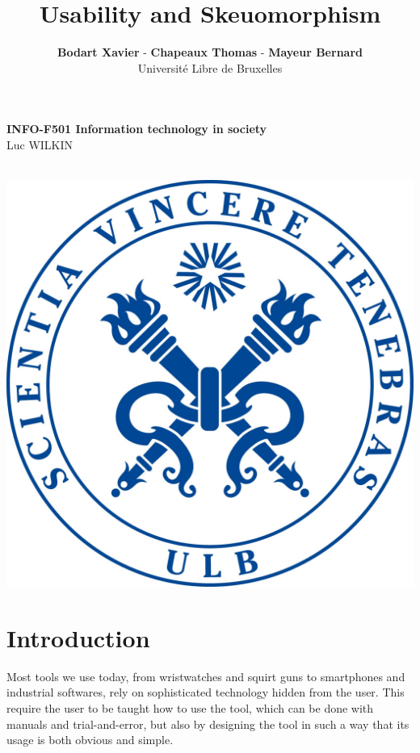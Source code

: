\documentclass[a4paper,11pt] {article}
\theoremstyle{definition}
\begin{document}
\title{\textbf{Usability and Skeuomorphism}}
\author{\textbf{Bodart Xavier} - \textbf{Chapeaux Thomas} - \textbf{Mayeur Bernard} \\
Université Libre de Bruxelles}

\maketitle
\begin{center}

\textbf{INFO-F501 Information technology in society} \\
Luc WILKIN
\end{center}
\begin{center}

~\\

\includegraphics[scale=0.15]{fig-report/ULBjea.jpg}
\end{center}
\pagebreak
\tableofcontents
\pagebreak
\section{Introduction}

Most tools we use today, from wristwatches and squirt guns to smartphones and industrial softwares, rely on sophisticated technology hidden from the user. This require the user to be taught how to use the tool, which can be done with manuals and trial-and-error, but also by designing the tool in such a way that its usage is both obvious and simple.\\
\end{document}
